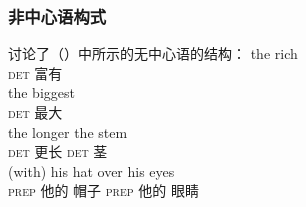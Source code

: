 %
\subsubsection{非中心语构式}
\label{sec-headless-constructions-dg}
%
 \citet[\S~4.E]{Hudson80a}讨论了（）中所示的无中心语的结构：
\eal
\ex 
\gll the rich\\
\textsc{det} 富有\\
\ex 
\gll the biggest\\
\textsc{det} 最大\\
\ex 
\gll the longer the stem\\
\textsc{det} 更长 \textsc{det} 茎\\
\ex 
\gll (with) his hat over his eyes\\
     \textsc{prep} 他的 帽子 \textsc{prep} 他的 眼睛\\
\zl
